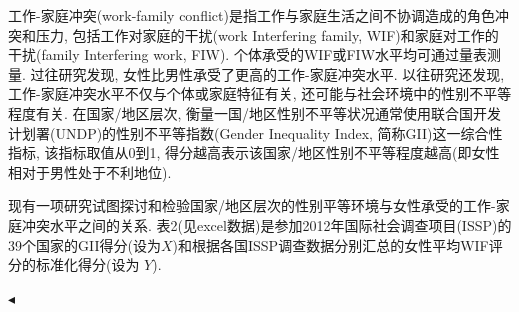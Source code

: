 \documentclass[11pt]{article}
\newenvironment{problem}[2][Problem]{\begin{trivlist}
\item[\hskip \labelsep {\bfseries #1}\hskip \labelsep {\bfseries #2.}]\songti}{\hfill$\blacktriangleleft$\end{trivlist}}
\newcommand\1{\mathds{1}}
\begin{document}
\begin{problem}{2}
    工作-家庭冲突(work-family conflict)是指工作与家庭生活之间不协调造成的角色冲突和压力, 包括工作对家庭的干扰(work Interfering family, WIF)和家庭对工作的干扰(family Interfering work, FIW). 个体承受的WIF或FIW水平均可通过量表测量. 过往研究发现, 女性比男性承受了更高的工作-家庭冲突水平. 以往研究还发现, 工作-家庭冲突水平不仅与个体或家庭特征有关, 还可能与社会环境中的性别不平等程度有关. 在国家/地区层次, 衡量一国/地区性别不平等状况通常使用联合国开发计划署(UNDP)的性别不平等指数(Gender Inequality Index, 简称GII)这一综合性指标, 该指标取值从0到1, 得分越高表示该国家/地区性别不平等程度越高(即女性相对于男性处于不利地位). 
    
    现有一项研究试图探讨和检验国家/地区层次的性别平等环境与女性承受的工作-家庭冲突水平之间的关系. 表2(见excel数据)是参加2012年国际社会调查项目(ISSP)的39个国家的GII得分(设为$X$)和根据各国ISSP调查数据分别汇总的女性平均WIF评分的标准化得分(设为 $Y$). 


\end{problem}
\end{document}
